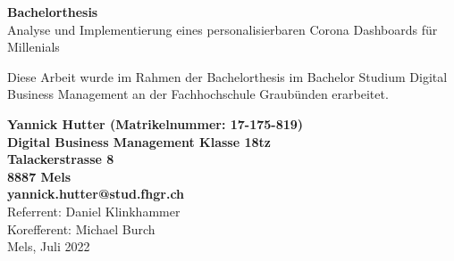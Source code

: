\documentclass[12pt, oneside]{article}
\begin{document}
\begin{titlepage}
	\begin{center}
		\Huge
		\textbf{Bachelorthesis}\\
		\vspace{0.5cm}
		\LARGE
		Analyse und Implementierung eines personalisierbaren Corona Dashboards für Millenials
		
		\vspace{1cm}
		\small
		Diese Arbeit wurde im Rahmen der Bachelorthesis im Bachelor Studium Digital Business Management an der Fachhochschule Graubünden erarbeitet.

		\vspace{1.5cm}
		\normalsize
		\textbf{Yannick Hutter (Matrikelnummer: 17-175-819)}\\
		\textbf{Digital Business Management Klasse 18tz}\\
		\textbf{Talackerstrasse 8}\\
		\textbf{8887 Mels}\\
		\textbf{yannick.hutter@stud.fhgr.ch}\\


		\vfill
		Referrent: Daniel Klinkhammer\\
		Korefferent: Michael Burch\\

		\vspace{0.8cm}
		Mels, Juli 2022
	\end{center}
\end{titlepage}

\clearpage



\clearpage
\tableofcontents

\clearpage
\listoffigures
\listoftables


\clearpage
\printglossary[title=Abkürzungsverzeichnis, type=\acronymtype]

\clearpage
{}




\clearpage


\clearpage


\clearpage


\clearpage


\clearpage

\end{document}
